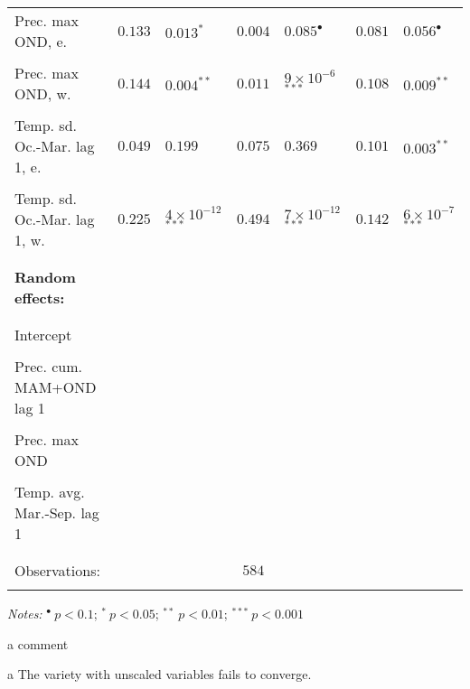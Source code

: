 \documentclass[a4paper,12pt]{article}
\begin{document}
{\begin{threeparttable}
\begin{small}
\begin{tabular}{lrlclcl}
      \vspace{-0.2cm}Prec. max OND, e.&$0.133$&$0.013^{*}$&$0.004$&$0.085^{\bullet}$&$0.081$&$0.056^{\bullet}$\\
  \\
        \vspace{-0.2cm}Prec. max OND, w.&$0.144$&$0.004^{**}$&$0.011$& $9\times10^{-6}$$^{***}$&$0.108$&$0.009^{**}$\\
  \\
    \vspace{-0.2cm}Temp. sd. Oc.-Mar. lag 1, e.&$0.049$&$0.199$&$0.075$&$0.369$&$0.101$&$0.003^{**}$\\
  \\
      \vspace{-0.2cm}Temp. sd. Oc.-Mar. lag 1, w.&$0.225$& $4\times10^{-12}$$^{***}$&$0.494$&$7\times10^{-12}$$^{***}$&$0.142$&$6\times10^{-7}$ $^{***}$\\
  \\
  \hline
\vspace{-0.2cm} \\
  \multicolumn{1}{l}{\textbf{Random effects:}}  & \\
\vspace{-0.2cm}
\\
\hline
\\
  \vspace{-0.2cm}Intercept\\
  \\
  \vspace{-0.2cm}Prec. cum. MAM+OND lag 1\\
  \\
  \vspace{-0.2cm}Prec. max OND\\
  \\
    \vspace{-0.2cm}Temp. avg. Mar.-Sep. lag 1\\
  
  \\
  \hline
\vspace{-0.4cm} \\ Observations:&  \multicolumn{5}{c}{$584$} \\  \vspace{-0.4cm}
\\
\hline
\end{tabular} 
\end{small}
 \begin{tablenotes}
  \begin{footnotesize}
    \item \textit{Notes:} \hspace{0.15cm}$^{\bullet}~p<0.1$; $^{*}~p<0.05$; $^{**}~p<0.01$; $^{***}~p<0.001$
    \begin{adjustwidth}{1cm}{} \item a comment
    \item[a] The variety with unscaled variables fails to converge.
     \end{adjustwidth}
\singlespacing
  \end{footnotesize}
\end{tablenotes}
  \end{threeparttable} 
\par}
\end{document}
